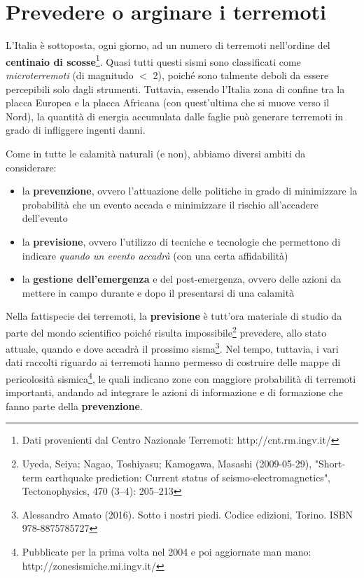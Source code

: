 \documentclass[a4paper,10pt]{memoir}
\begin{document}
\section{Prevedere o arginare i terremoti}

L'Italia è sottoposta, ogni giorno, ad un numero di terremoti nell'ordine del \textbf{centinaio di scosse}\footnote{Dati provenienti dal Centro Nazionale Terremoti: http://cnt.rm.ingv.it/}. Quasi tutti questi sismi sono classificati come \textit{microterremoti} (di magnitudo $<$ 2), poiché sono talmente deboli da essere percepibili solo dagli strumenti. Tuttavia, essendo l'Italia zona di confine tra la placca Europea e la placca Africana (con quest'ultima che si muove verso il Nord), la quantità di energia accumulata dalle faglie può generare terremoti in grado di infliggere ingenti danni.

Come in tutte le calamità naturali (e non), abbiamo diversi ambiti da considerare:
\begin{itemize}
\item la \textbf{prevenzione}, ovvero l'attuazione delle politiche in grado di minimizzare la probabilità che un evento accada e minimizzare il rischio all'accadere dell'evento
\item la \textbf{previsione}, ovvero l'utilizzo di tecniche e tecnologie che permettono di indicare \textit{quando un evento accadrà} (con una certa affidabilità)
\item la \textbf{gestione dell'emergenza} e del post-emergenza, ovvero delle azioni da mettere in campo durante e dopo il presentarsi di una calamità
\end{itemize}

Nella fattispecie dei terremoti, la \textbf{previsione} è tutt'ora materiale di studio da parte del mondo scientifico poiché risulta impossibile\footnote{Uyeda, Seiya; Nagao, Toshiyasu; Kamogawa, Masashi (2009-05-29), "Short-term earthquake prediction: Current status of seismo-electromagnetics", Tectonophysics, 470 (3–4): 205–213} prevedere, allo stato attuale, quando e dove accadrà il prossimo sisma\footnote{Alessandro Amato (2016). Sotto i nostri piedi. Codice edizioni, Torino. ISBN 978-8875785727}. Nel tempo, tuttavia, i vari dati raccolti riguardo ai terremoti hanno permesso di costruire delle mappe di pericolosità sismica\footnote{Pubblicate per la prima volta nel 2004 e poi aggiornate man mano: http://zonesismiche.mi.ingv.it/}, le quali indicano zone con maggiore probabilità di terremoti importanti, andando ad integrare le azioni di informazione e di formazione che fanno parte della \textbf{prevenzione}.
\end{document}
